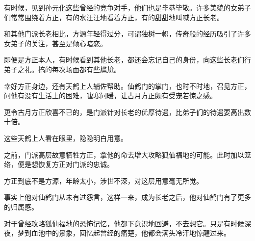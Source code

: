 \begin{this_body}
有时候，见到孙元化这些曾经的竞争对手，他们也是毕恭毕敬。许多美貌的女弟子们常常围绕着方正，有的水汪汪地看着方正，有的甜甜地叫喊方正长老。

和其他门派长老相比，方源年轻得过分，可谓独树一帜，传奇般的经历吸引了许多女弟子的关注，甚至是倾心暗恋。

即便是方正本人，有时候看到其他长老，都还会忘记自己的身份，向这些长老们行弟子之礼。搞的每次场面都有些尴尬。

幸好方正身边，还有天鹤上人辅佐帮助。仙鹤门的掌门，也时不时地，召见方正，问他有没有生活上的困难，嘘寒问暖，让古月方正颇有受宠若惊之感。

更令古月方正欣喜不已的，是门派针对长老的优厚待遇，比弟子们的待遇要高出数十倍。

这些天鹤上人看在眼里，隐隐明白用意。

之前，门派高层故意牺牲方正，拿他的命去增大攻略狐仙福地的可能。此时加以笼络，便是想恢复方正对门派的忠诚。

方正到底不是方源，年龄太小，涉世不深，对这层用意毫无所觉。

事实上他对仙鹤门从未有过怨言，这样一来，成为长老之后，他对仙鹤门有了更多的归属感。

对于曾经攻略狐仙福地的恐怖记忆，他都下意识地回避，不去想它。只是有时候深夜，梦到血池中的景象，回忆起曾经的痛楚，他都会满头冷汗地惊醒过来。

\end{this_body}

